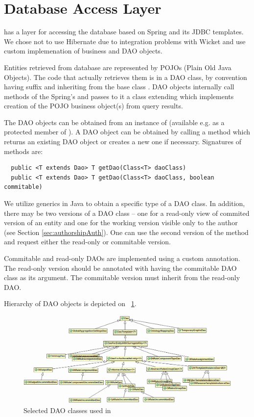 \section{Database Access Layer}
\label{sec:frontendDao}
\FE has a layer for accessing the database based on Spring and its JDBC templates. We chose not to use Hibernate due to integration problems with Wicket and use custom implemenation of business and DAO objects.

Entities retrieved from database are represented by POJOs (Plain Old Java Objects). The code that actually retrieves them is in a DAO class, by convention having suffix  and inheriting from the base class . DAO objects internally call methods of the Spring's  and passes to it a class extending  which implements creation of the POJO business object(s) from query results.

The DAO objects can be obtained from an instance of  (available e.g. as a protected member of ). A DAO object can be obtained by calling a  method which returns an existing DAO object or creates a new one if necessary. Signatures of  methods are:

\begin{verbatim}
  public <T extends Dao> T getDao(Class<T> daoClass)
  public <T extends Dao> T getDao(Class<T> daoClass, boolean commitable)
\end{verbatim}

We utilize generics in Java to obtain a specific type of a DAO class. In addition, there may be two versions of a DAO class -- one for a read-only view of commited version of an entity and one for the working version visible only to the author (see Section \ref{sec:authorshipAuth}). One can use the second version of the  method and request either the read-only or commitable version.

Commitable and read-only DAOs are implemented using a custom  annotation. The read-only version should be annotated with  having the commitable DAO class as its argument. The commitable version must inherit from the read-only DAO.

Hierarchy of DAO objects is depicted on \figurename~\ref{fig:feDAO}.

\begin{figure}[htb]
    \centering
    \includegraphics[width=1.05\textwidth]{images/dia-fe-dao.png}
    \caption{Selected DAO classes used in \FE}
	\label{fig:feDAO}
\end{figure}

